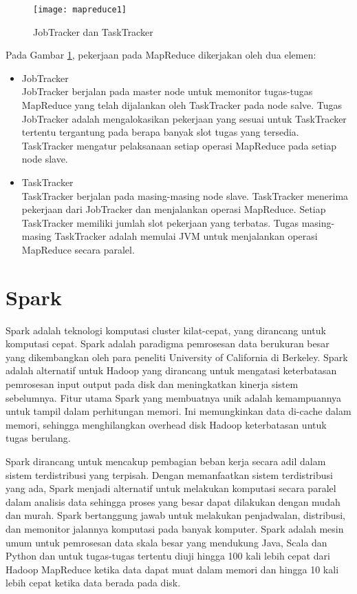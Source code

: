 \begin{figure}[H]
	\centering
	\texttt{[image: mapreduce1]}
	\caption{JobTracker dan TaskTracker}
	\label{fig:jobtracker}
\end{figure}

\noindent Pada Gambar \ref{fig:jobtracker}, pekerjaan pada MapReduce dikerjakan oleh dua elemen:

\begin{itemize}
\item JobTracker\\
JobTracker berjalan pada master node untuk memonitor tugas-tugas MapReduce yang telah dijalankan oleh TaskTracker pada node salve. Tugas JobTracker adalah mengalokasikan pekerjaan yang sesuai untuk TaskTracker tertentu tergantung pada berapa banyak slot tugas yang tersedia. TaskTracker mengatur pelaksanaan setiap operasi MapReduce pada setiap node slave. 
\item TaskTracker\\
TaskTracker berjalan pada masing-masing node slave. TaskTracker menerima pekerjaan dari JobTracker dan menjalankan operasi MapReduce. Setiap TaskTracker memiliki jumlah slot pekerjaan yang terbatas. Tugas masing-masing TaskTracker adalah memulai JVM untuk menjalankan operasi MapReduce secara paralel. 
\end{itemize}

\section{Spark} 
Spark adalah teknologi komputasi cluster kilat-cepat, yang dirancang untuk komputasi cepat. Spark adalah paradigma pemrosesan data berukuran besar yang dikembangkan oleh para peneliti University of California di Berkeley. Spark adalah alternatif untuk Hadoop yang dirancang untuk mengatasi keterbatasan pemrosesan input output pada disk dan meningkatkan kinerja sistem sebelumnya. Fitur utama Spark yang membuatnya unik adalah kemampuannya untuk tampil dalam perhitungan memori. Ini memungkinkan data di-cache dalam memori, sehingga menghilangkan overhead disk Hadoop keterbatasan untuk tugas berulang. 
 
\par Spark dirancang untuk mencakup pembagian beban kerja secara adil dalam sistem terdistribusi yang terpisah. Dengan memanfaatkan sistem terdistribusi yang ada, Spark menjadi alternatif untuk melakukan komputasi secara paralel dalam analisis data sehingga proses yang besar dapat dilakukan dengan mudah dan murah. Spark bertanggung jawab untuk melakukan penjadwalan, distribusi, dan memonitor jalannya komputasi pada banyak komputer. Spark adalah mesin umum untuk pemrosesan data skala besar yang mendukung Java, Scala dan Python dan untuk tugas-tugas tertentu diuji hingga 100 kali lebih cepat dari Hadoop MapReduce ketika data dapat muat dalam memori dan hingga 10 kali lebih cepat ketika data berada pada disk.

